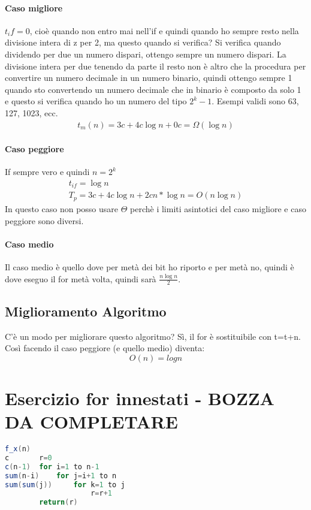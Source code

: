 \paragraph*{Caso migliore} $t_if = 0$, cioè quando non entro mai nell'if e quindi quando ho
sempre resto nella divisione intera di z per 2, ma questo quando si verifica? Si verifica quando
dividendo per due un numero dispari, ottengo sempre un numero dispari. La divisione intera per due tenendo
da parte il resto non è altro che la procedura per convertire un numero decimale in un numero binario, quindi
ottengo sempre 1 quando sto convertendo un numero decimale che in binario è composto da solo 1 e questo si verifica
quando ho un numero del tipo $2^k - 1$. Esempi validi sono 63, 127, 1023, ecc.\\
\begin{align*}
    t_m(n)=3c+4c \log n + 0c = \Omega(\log n)
\end{align*}
\paragraph*{Caso peggiore} If sempre vero e quindi $n=2^k$
\begin{align*}
    t_{if}=\log n\\
    T_p=3c+4c\log n + 2cn*\log n = O(n\log n)
\end{align*}
In questo caso non posso usare $\Theta$ perchè i limiti asintotici del caso migliore e caso
peggiore sono diversi.
\paragraph*{Caso medio}
Il caso medio è quello dove per metà dei bit ho riporto e per metà no, quindi è dove eseguo il for
metà volta, quindi sarà $\frac{n \log n}{2}$.
\subsection{Miglioramento Algoritmo}
C'è un modo per migliorare questo algoritmo? Sì, il for è sostituibile con t=t+n.\\
Così facendo il caso peggiore (e quello medio) diventa:
\begin{equation*}
    O(n)=log n
\end{equation*}
\section{Esercizio for innestati - BOZZA DA COMPLETARE}
\begin{lstlisting}[language=Java]
    f_x(n)
c       r=0
c(n-1)  for i=1 to n-1
sum(n-i)    for j=i+1 to n
sum(sum(j))     for k=1 to j
                    r=r+1
        return(r)
\end{lstlisting}
